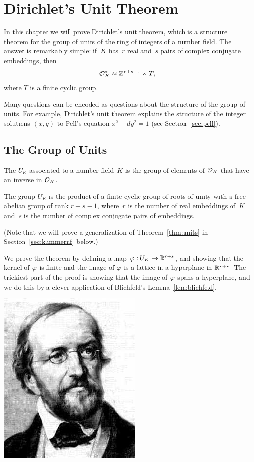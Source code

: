 \chapter{Dirichlet's Unit Theorem}
In this chapter we will prove Dirichlet's unit theorem,
which is a structure theorem for the group
of units of the ring of integers of a number field.  The answer is
remarkably simple: if~$K$ has~$r$ real and~$s$ pairs of
complex conjugate embeddings,
then
$$
\mathcal{O}_K^*\approx \mathbb{Z}^{r+s-1} \times T,
$$
where $T$ is a finite cyclic group.

Many questions can be encoded as questions about the structure of the
group of units.  For example, Dirichlet's unit theorem explains
the structure of the  integer solutions $(x,y)$ to Pell's equation $x^2-dy^2=1$
(see Section~\ref{sec:pell}).


\section{The Group of Units}
\begin{definition}
The  $U_K$ associated to a number field~$K$ is the
group of elements of $\mathcal{O}_K$ that have an inverse in $\mathcal{O}_K$.
\end{definition}

\begin{theorem}[Dirichlet]\label{thm:units}
The group $U_K$ is the product of a finite cyclic group of roots of
unity with a free abelian group of rank $r+s-1$, where~$r$ is the
number of real embeddings of~$K$ and~$s$ is the number of complex
conjugate pairs of embeddings.
\end{theorem}
(Note that we will prove a generalization of Theorem~\ref{thm:units} in
Section~\ref{sec:kummernf} below.)

We prove the theorem by defining a map $\varphi:U_K\to \mathbb{R}^{r+s}$, and
showing that the kernel of $\varphi$ is finite and the image of $\varphi$
is a lattice in a hyperplane in $\mathbb{R}^{r+s}$.  The trickiest part of the
proof is showing that the image of $\varphi$ spans a hyperplane, and we
do this by a clever application of Blichfeld's Lemma~\ref{lem:blichfeld}.

\begin{center}
\includegraphics[width=.3\textwidth]{graphics/dirichlet}
\end{center}

